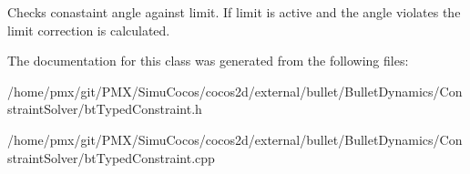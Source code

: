 Checks conastaint angle against limit. If limit is active and the angle violates the limit correction is calculated. 

The documentation for this class was generated from the following files\+:\begin{DoxyCompactItemize}
\item 
/home/pmx/git/\+P\+M\+X/\+Simu\+Cocos/cocos2d/external/bullet/\+Bullet\+Dynamics/\+Constraint\+Solver/bt\+Typed\+Constraint.\+h\item 
/home/pmx/git/\+P\+M\+X/\+Simu\+Cocos/cocos2d/external/bullet/\+Bullet\+Dynamics/\+Constraint\+Solver/bt\+Typed\+Constraint.\+cpp\end{DoxyCompactItemize}
